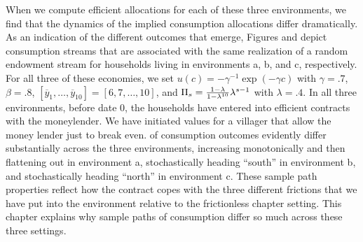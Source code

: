 When we compute efficient allocations for each of these three
environments, we  find that the dynamics of the implied
consumption allocations differ dramatically. As an indication of the different outcomes that emerge,
Figures  and  depict   consumption streams
that are associated with the same
realization of a random endowment stream for households living
in environments a, b, and c, respectively.
For all three of these economies,
 we set $u(c) =-{\gamma}^{-1} \exp(-\gamma c)$
with $\gamma=.7$, $\beta =.8$,
$[\overline y_1, \ldots, \overline y_{10}] = [6, 7, \ldots, 10]$,
and $\Pi_s = {1-\lambda \over 1-\lambda^{10}} \lambda^{s-1}$ with
$\lambda=.4$.
In all three environments, before date $0$, the households have
entered into efficient contracts with the moneylender. We have initiated  values for a villager that allow the money lender just to break even.
%
of consumption outcomes evidently differ substantially across the
three environments, increasing monotonically and then flattening out in environment a,
stochastically heading ``south'' in environment b, and stochastically heading ``north'' in
environment c.
These sample path properties reflect how the contract copes with the three different frictions that we have put into the environment relative
to the frictionless chapter   setting.  This chapter  explains why  sample paths of consumption differ
so much across these three settings.



